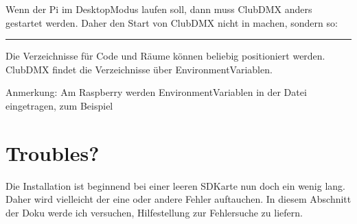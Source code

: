 \documentclass[letterpaper,10pt,ngerman]{sphinxmanual}
\begin{document}

Wenn der Pi im Desktop\sphinxhyphen{}Modus laufen soll, dann muss ClubDMX anders gestartet
werden. Daher den Start von ClubDMX nicht in  machen, sondern so:

\begin{sphinxVerbatim}[commandchars=\\\{\}]
  
 
\end{sphinxVerbatim}


\bigskip\hrule\bigskip



Die Verzeichnisse für Code und Räume können beliebig positioniert werden.
ClubDMX findet die Verzeichnisse über Environment\sphinxhyphen{}Variablen.

\begin{sphinxVerbatim}[commandchars=\\\{\}]
\end{sphinxVerbatim}

Anmerkung: Am Raspberry werden Environment\sphinxhyphen{}Variablen in der Datei
  eingetragen, zum Beispiel



\section{Troubles?}
\label{\detokenize{raspberry:troubles}}
Die Installation ist \sphinxhyphen{} beginnend bei einer leeren SD\sphinxhyphen{}Karte \sphinxhyphen{} nun doch ein
wenig lang. Daher wird vielleicht der eine oder andere Fehler auftauchen.
In diesem Abschnitt der Doku werde ich versuchen, Hilfestellung zur
Fehlersuche zu liefern.
\end{document}

